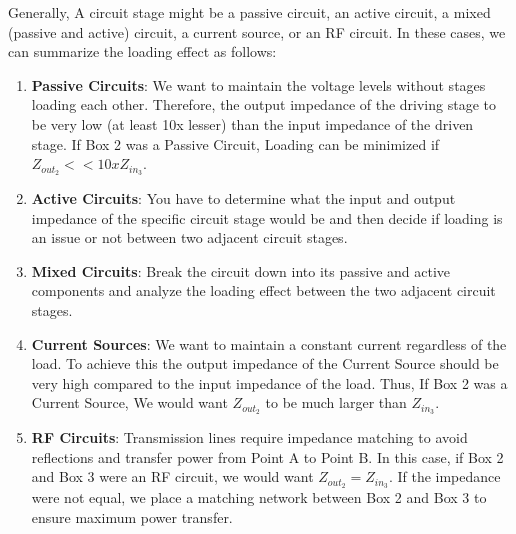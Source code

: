 Generally, A circuit stage might be a passive circuit, an active circuit,
a mixed (passive and active) circuit, a current source, or an RF circuit.
In these cases, we can summarize the loading effect as follows:

\begin{enumerate}
  \item \textbf{Passive Circuits}: We want to maintain the voltage
    levels without stages loading each other. Therefore, the output
    impedance of the driving stage to be very low (at least 10x lesser)
    than the input impedance of the driven stage. If Box 2 was a Passive
    Circuit, Loading can be minimized if \(Z_{out_2} << 10 x Z_{in_3}\).
  \item \textbf{Active Circuits}: You have to determine what the
    input and output impedance of the specific circuit stage would
    be and then decide if loading is an issue or not between two
    adjacent circuit stages.
  \item \textbf{Mixed Circuits}: Break the circuit down into its
    passive and active components and analyze the loading effect between
    the two adjacent circuit stages.
  \item \textbf{Current Sources}: We want to maintain a constant current
    regardless of the load. To achieve this the output impedance
    of the Current Source should be very high compared to the input
    impedance of the load. Thus, If Box 2 was a Current Source, We would
    want $Z_{out_2}$ to be much larger than $Z_{in_3}$.
  \item \textbf{RF Circuits}: Transmission lines require impedance matching
    to avoid reflections and transfer power from Point A to Point B. In
    this case, if Box 2 and Box 3 were an RF circuit, we would want
    \(Z_{out_2} = Z_{in_3}\). If the impedance were not equal, we place a
    matching network between Box 2 and Box 3 to ensure maximum power transfer.
\end{enumerate}

